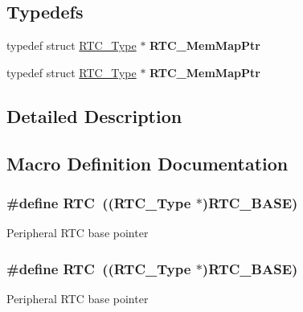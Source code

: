 \subsection*{Typedefs}
\begin{DoxyCompactItemize}
\item 
typedef struct \hyperlink{structRTC__Type}{R\+T\+C\+\_\+\+Type} $\ast$ {\bfseries R\+T\+C\+\_\+\+Mem\+Map\+Ptr}\hypertarget{group__RTC__Peripheral__Access__Layer_ga3bb3df20a2a1844e7dade1dc50ac3a27}{}\label{group__RTC__Peripheral__Access__Layer_ga3bb3df20a2a1844e7dade1dc50ac3a27}

\item 
typedef struct \hyperlink{structRTC__Type}{R\+T\+C\+\_\+\+Type} $\ast$ {\bfseries R\+T\+C\+\_\+\+Mem\+Map\+Ptr}\hypertarget{group__RTC__Peripheral__Access__Layer_ga3bb3df20a2a1844e7dade1dc50ac3a27}{}\label{group__RTC__Peripheral__Access__Layer_ga3bb3df20a2a1844e7dade1dc50ac3a27}

\end{DoxyCompactItemize}


\subsection{Detailed Description}


\subsection{Macro Definition Documentation}
\subsubsection[{\texorpdfstring{R\+TC}{RTC}}]{\setlength{\rightskip}{0pt plus 5cm}\#define R\+TC~(({\bf R\+T\+C\+\_\+\+Type} $\ast$){\bf R\+T\+C\+\_\+\+B\+A\+SE})}\hypertarget{group__RTC__Peripheral__Access__Layer_ga5359a088f5d8b20ce74d920e46059304}{}\label{group__RTC__Peripheral__Access__Layer_ga5359a088f5d8b20ce74d920e46059304}
Peripheral R\+TC base pointer 
\subsubsection[{\texorpdfstring{R\+TC}{RTC}}]{\setlength{\rightskip}{0pt plus 5cm}\#define R\+TC~(({\bf R\+T\+C\+\_\+\+Type} $\ast$){\bf R\+T\+C\+\_\+\+B\+A\+SE})}\hypertarget{group__RTC__Peripheral__Access__Layer_ga5359a088f5d8b20ce74d920e46059304}{}\label{group__RTC__Peripheral__Access__Layer_ga5359a088f5d8b20ce74d920e46059304}
Peripheral R\+TC base pointer 
